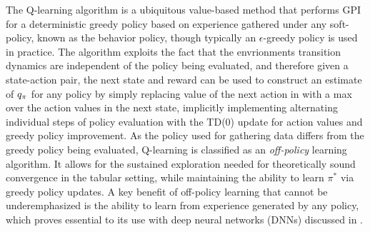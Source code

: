 The Q-learning algorithm  is a ubiquitous value-based method that performs GPI for a deterministic greedy policy based on experience gathered under any soft-policy, known as the behavior policy, though typically an $\epsilon$-greedy policy is used in practice. The algorithm 
exploits the fact that the envrionments transition dynamics are independent of the policy being evaluated, and therefore given a state-action pair, the next state and reward can be used to construct an estimate of $q_{\pi}$ for any policy by simply replacing value of the next action in  with a max over the action values in the next state, implicitly implementing alternating individual steps of policy evaluation with the TD(0) update for action values and greedy policy improvement. %
As the policy used for gathering data differs from the greedy policy being evaluated, Q-learning is classified as an \textit{off-policy} learning algorithm. It allows for the sustained exploration needed for theoretically sound convergence in the tabular setting, while maintaining the ability to learn $\pi^*$ via greedy policy updates. A key benefit of off-policy learning that cannot be underemphasized is the ability to learn from experience generated by any policy, which proves essential to its use with deep neural networks (DNNs) discussed in . 

